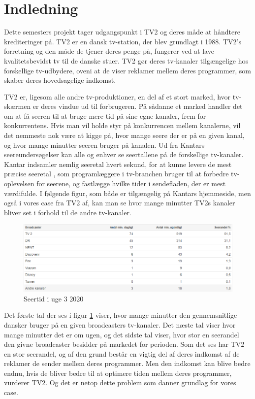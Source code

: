 \clearpage
\section{Indledning}
Dette semesters projekt tager udgangspunkt i TV2 og deres måde at håndtere krediteringer på. TV2 er en dansk tv-station, der blev grundlagt i 1988. TV2's forretning og den måde de tjener deres penge på, fungerer ved at lave kvalitetsbevidst tv til de danske stuer. TV2 gør deres tv-kanaler tilgængelige hos forskellige tv-udbydere, oveni at de viser reklamer mellem deres programmer, som skaber deres hovedsagelige indkomst.

TV2 er, ligesom alle andre tv-produktioner, en del af et stort marked, hvor tv-skærmen er deres vindue ud til forbrugeren. På sådanne et marked handler det om at få seeren til at bruge mere tid på sine egne kanaler, frem for konkurrentens. Hvis man vil holde styr på konkurrencen mellem kanalerne, vil det nemmeste nok være at kigge på, hvor mange seere der er på en given kanal, og hvor mange minutter seeren bruger på kanalen. Ud fra Kantars seereundersøgelser kan alle og enhver se seertallene på de forskellige tv-kanaler. Kantar indsamler nemlig seeretal hvert sekund, for at kunne levere de mest præcise seeretal \cite{url_kantar} , som programlæggere i tv-branchen bruger til at forbedre tv-oplevelsen for seerene, og fastlægge hvilke tider i sendefladen, der er mest værdifulde. I følgende figur, som både er tilgængelig på Kantars hjemmeside, men også i vores case fra TV2 af, kan man se hvor mange minutter TV2s kanaler bliver set i forhold til de andre tv-kanaler.
\begin{figure}[H]
    \centering
    \includegraphics[width=1\textwidth]{images/Seertal.png}
    \caption{Seertid i uge 3 2020}
    \label{fig:Seertid}
\end{figure}
Det første tal der ses i figur \ref{fig:Seertid} viser, hvor mange minutter den gennemsnitlige dansker bruger på en given broadcasters tv-kanaler. Det næste tal viser hvor mange minutter det er om ugen, og det sidste tal viser, hvor stor en seerandel den givne broadcaster besidder på markedet for perioden. 
Som det ses har TV2 en stor seerandel, og af den grund består en vigtig del af deres indkomst af de reklamer de sender mellem deres programmer.  Men den indkomst kan blive bedre endnu, hvis de bliver bedre til at optimere tiden mellem deres programmer, vurderer TV2. Og det er netop dette problem som danner grundlag for vores case.

